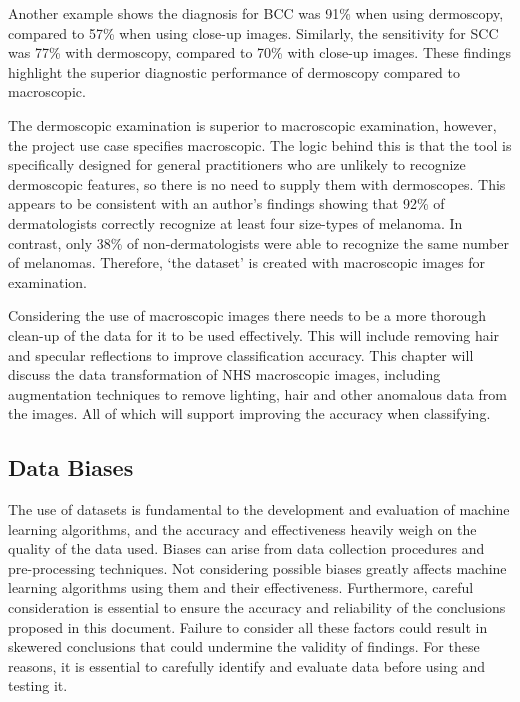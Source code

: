 Another example shows the diagnosis for BCC was 91\% when using dermoscopy, compared to 57\% when using close-up images\cite{Dascalu2022}. Similarly, the sensitivity for SCC was 77\% with dermoscopy, compared to 70\% with close-up images\cite{Dascalu2022}. These findings highlight the superior diagnostic performance of dermoscopy compared to macroscopic.

The dermoscopic examination is superior to macroscopic examination, however, the project use case specifies macroscopic. The logic behind this is that the tool is specifically designed for general practitioners who are unlikely to recognize dermoscopic features, so there is no need to supply them with dermoscopes. This appears to be consistent with an author's findings showing that 92\% of dermatologists correctly recognize at least four size-types of melanoma. In contrast, only 38\% of non-dermatologists were able to recognize the same number of melanomas\cite{Tae2019}. Therefore, `the dataset' is created with macroscopic images for examination.

Considering the use of macroscopic images there needs to be a more thorough clean-up of the data for it to be used effectively. This will include removing hair and specular reflections to improve classification accuracy. This chapter will discuss the data transformation of NHS macroscopic images, including augmentation techniques to remove lighting, hair and other anomalous data from the images. All of which will support improving the accuracy when classifying.

\subsection{Data Biases}
The use of datasets is fundamental to the development and evaluation of machine learning algorithms, and the accuracy and effectiveness heavily weigh on the quality of the data used. Biases can arise from data collection procedures and pre-processing techniques. Not considering possible biases greatly affects machine learning algorithms using them and their effectiveness. Furthermore, careful consideration is essential to ensure the accuracy and reliability of the conclusions proposed in this document. Failure to consider all these factors could result in skewered conclusions that could undermine the validity of findings. For these reasons, it is essential to carefully identify and evaluate data before using and testing it.

